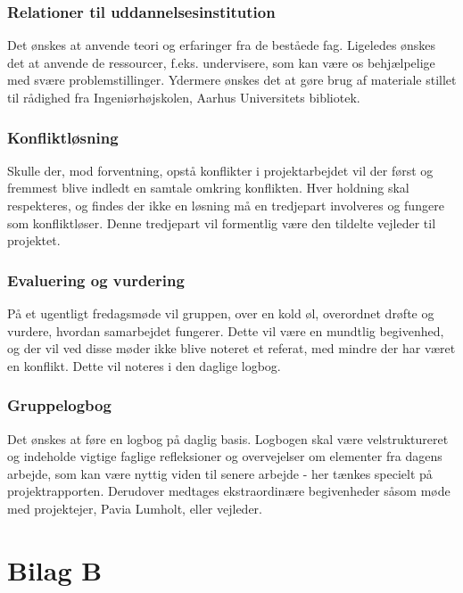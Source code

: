 \subsubsection{Relationer til uddannelsesinstitution}
Det ønskes at anvende teori og erfaringer fra de beståede fag. Ligeledes ønskes det at anvende de ressourcer, f.eks. undervisere, som kan være os behjælpelige med svære problemstillinger. Ydermere ønskes det at gøre brug af materiale stillet til rådighed fra Ingeniørhøjskolen, Aarhus Universitets bibliotek. 

\subsubsection{Konfliktløsning}
Skulle der, mod forventning, opstå konflikter i projektarbejdet vil der først og fremmest blive indledt en samtale omkring konflikten. Hver holdning skal respekteres, og findes der ikke en løsning må en tredjepart involveres og fungere som konfliktløser. Denne tredjepart vil formentlig være den tildelte vejleder til projektet.   

\subsubsection{Evaluering og vurdering}
På et ugentligt fredagsmøde vil gruppen, over en kold øl, overordnet drøfte og vurdere, hvordan samarbejdet fungerer. Dette vil være en mundtlig begivenhed, og der vil ved disse møder ikke blive noteret et referat, med mindre der har været en konflikt. Dette vil noteres i den daglige logbog.

\subsubsection{Gruppelogbog} 
Det ønskes at føre en logbog på daglig basis. Logbogen skal være velstruktureret og  indeholde vigtige faglige refleksioner og overvejelser om elementer fra dagens arbejde, som kan være nyttig viden til senere arbejde - her tænkes specielt på projektrapporten. Derudover medtages ekstraordinære begivenheder såsom møde med projektejer, Pavia Lumholt, eller vejleder.     

\newpage

\section{Bilag B}

